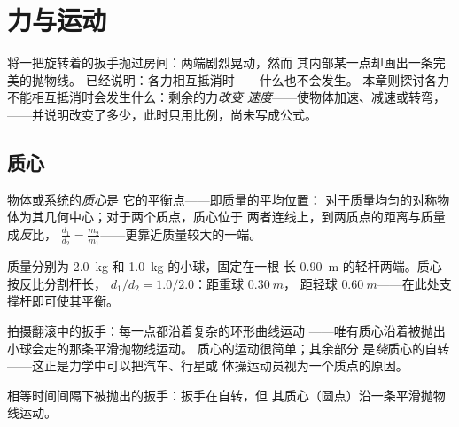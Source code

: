 \chapter{力与运动}\label{ch:g11:forces-and-motion}

将一把旋转着的扳手抛过房间：两端剧烈晃动，然而
其内部某一点却画出一条完美的抛物线。
已经说明：各力相互抵消时——什么也不会发生。
本章则探讨各力不能相互抵消时会发生什么：剩余的力\emph{改变
速度}——使物体加速、减速或转弯，
——并说明改变了多少，此时只用比例，尚未写成公式。

\section{质心}

\begin{definition}[质心]\label{def:g11:forces-and-motion:com}
物体或系统的\emph{质心}是
它的平衡点——即质量的平均位置：
对于质量均匀的对称物体为其几何中心；对于两个质点，质心位于
两者连线上，到两质点的距离与质量成\emph{反}比，
$\frac{d_1}{d_2} = \frac{m_2}{m_1}$——更靠近质量较大的一端。
\end{definition}

\begin{example}[不对称的哑铃]\label{ex:g11:forces-and-motion:dumbbell}
质量分别为 \qty{2.0}{kg} 和 \qty{1.0}{kg} 的小球，固定在一根
长 \qty{0.90}{m} 的轻杆两端。质心按反比分割杆长，
$d_1/d_2 = 1.0/2.0$：距重球 $\qty{0.30}{m}$，
距轻球 $\qty{0.60}{m}$——在此处支撑杆即可使其平衡。
\end{example}

\begin{remark}[抛出的扳手]\label{rem:g11:forces-and-motion:wrench}
拍摄翻滚中的扳手：每一点都沿着复杂的环形曲线运动
——唯有质心沿着被抛出小球会走的那条平滑抛物线运动。
质心的运动很简单；其余部分
是\emph{绕}质心的自转——这正是力学中可以把汽车、行星或
体操运动员视为一个质点的原因。
\end{remark}

\begin{omfigure}

{\small 相等时间间隔下被抛出的扳手：扳手在自转，但
其质心（圆点）沿一条平滑抛物线运动。}
\end{omfigure}

